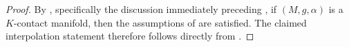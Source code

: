 \documentclass[11pt,reqno]{amsart}
\theoremstyle{plain}
\theoremstyle{definition}
\numberwithin{equation}{section}
\begin{document}
\begin{proof}
By \cite[§2.3]{ABM}, specifically the discussion immediately preceding
\cite[Theorem~2.6]{ABM}, if \((M,g,\alpha)\) is a \(K\)-contact manifold, then
the assumptions of  are satisfied. The
claimed interpolation statement therefore follows directly from
.
\end{proof}

\end{document}
